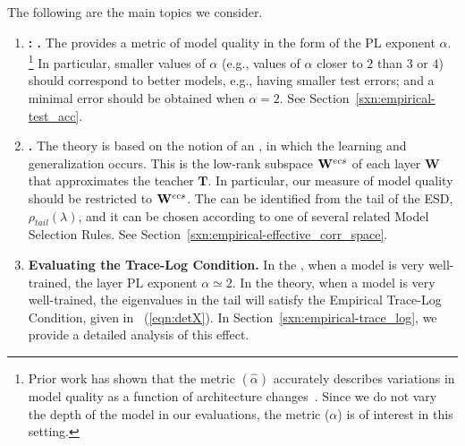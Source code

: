The following are the main topics we consider.

\begin{enumerate}[label=6.\arabic*]
\item
\textbf{\ModelQuality: \HTSR \Phenomenology.}
The \HTSR \Phenomenology provides a metric of model quality in the form of the PL exponent $\alpha$.%
\footnote{Prior work has shown that the \ALPHAHAT metric $(\hat{\alpha})$ accurately describes variations in model 
quality as a function of architecture changes~\cite{MM21a_simpsons_TR}. Since we do not vary the depth of the model in 
our evaluations, the \ALPHA metric ($\alpha$) is of interest in this setting.} 
In particular, smaller values of $\alpha$ (e.g., 
values of $\alpha$ closer to $2$ than $3$ or $4$) should correspond to better models, e.g., having smaller test errors; and
a minimal error should be obtained when $\alpha=2$.
See Section~\ref{sxn:empirical-test_acc}.
\item 
\textbf{\EffectiveCorrelationSpace.}
The \SETOL theory is based on the notion of an \EffectiveCorrelationSpace, in which the learning and generalization occurs. 
This is the low-rank subspace $\mathbf{W}^{ecs}$ of each layer $\mathbf{W}$ that approximates the teacher $\mathbf{T}$.
In particular, 
our measure of model quality should be restricted to $\mathbf{W}^{ecs}$.
The \EffectiveCorrelationSpace can be identified from the tail of the ESD, $\rho_{tail}(\lambda)$, and it can be chosen according to one of several related Model Selection Rules.
See Section~\ref{sxn:empirical-effective_corr_space}.
\item 
\textbf{Evaluating the Trace-Log Condition.}
In the \HTSR \Phenomenology, when a model is very well-trained, the layer PL exponent $\alpha\simeq 2$.
In the \SETOL theory, when a model is very well-trained, the eigenvalues in the tail will satisfy the Empirical Trace-Log Condition, given in \EQN~(\ref{eqn:detX}).
In Section~\ref{sxn:empirical-trace_log}, we provide a detailed analysis of this effect.

\end{enumerate}
